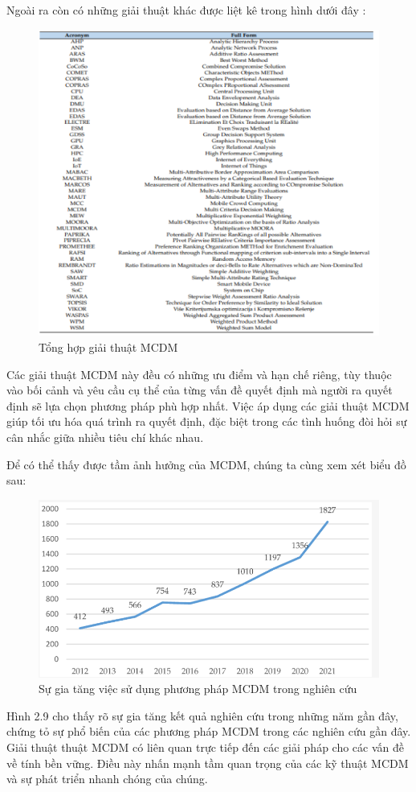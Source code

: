 Ngoài ra còn có những giải thuật khác được liệt kê trong hình dưới đây : 

\begin{figure}[H]
    \centering
    \includegraphics[width=0.8\linewidth]{images/MCDMalgorithm.png}
    \vspace{0.6cm}
    \caption{Tổng hợp giải thuật MCDM \cite{pijush}}
\end{figure}

Các giải thuật MCDM này đều có những ưu điểm và hạn chế riêng, tùy thuộc vào bối cảnh và yêu cầu cụ thể của từng vấn đề quyết định mà người ra quyết định sẽ lựa chọn phương pháp phù hợp nhất. Việc áp dụng các giải thuật MCDM giúp tối ưu hóa quá trình ra quyết định, đặc biệt trong các tình huống đòi hỏi sự cân nhắc giữa nhiều tiêu chí khác nhau. 

Để có thể thấy được tầm ảnh hưởng của MCDM, chúng ta cùng xem xét biểu đồ sau: 
\begin{figure}[H]
    \centering
    \includegraphics[width=0.5\linewidth]{images/MCDMgraph.png}
    \vspace{0.6cm}
    \caption{Sự gia tăng việc sử dụng phương pháp MCDM trong nghiên cứu}
\end{figure}

Hình 2.9 cho thấy rõ sự gia tăng kết quả nghiên cứu trong những năm gần đây, chứng tỏ sự phổ biến của các phương pháp MCDM trong các nghiên cứu gần đây. Giải thuật thuật MCDM có liên quan trực tiếp đến các giải pháp cho các vấn đề về tính bền vững. Điều này nhấn mạnh tầm quan trọng của các kỹ thuật MCDM và sự phát triển nhanh chóng của chúng. 


